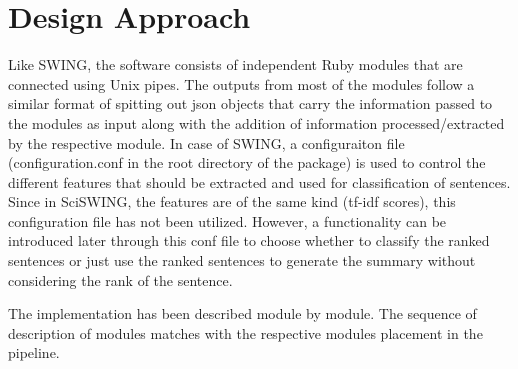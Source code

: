 \documentclass[12pt]{scrreprt}
\begin{document}
\chapter{Design Approach}
Like SWING, the software consists of independent Ruby modules that are connected using Unix pipes.
The outputs from most of the modules follow a similar format of spitting out json objects that carry the information passed to the modules as input along with the addition of information processed/extracted by the respective module.
In case of SWING, a configuraiton file (configuration.conf in the root directory of the package) is used to control the different features that should be extracted and used for classification of sentences.
Since in SciSWING, the features are of the same kind (tf-idf scores), this configuration file has not been utilized.
However, a functionality can be introduced later through this conf file to choose whether to classify the ranked sentences or just use the ranked sentences to generate the summary without considering the rank of the sentence.

The implementation has been described module by module. The sequence of description of modules matches with the respective modules placement in the pipeline.
\end{document}
